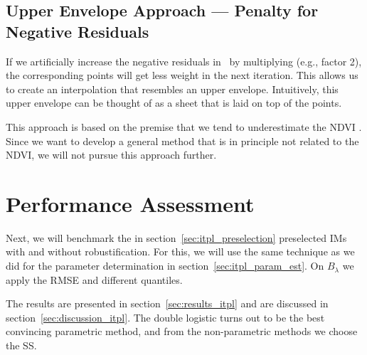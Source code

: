 {	\subsection{Upper Envelope Approach --- Penalty for Negative Residuals}
		If we artificially increase the negative residuals in~ by multiplying (e.g., factor 2), the corresponding points will get less weight in the next iteration. This allows us to create an interpolation that resembles an upper envelope. Intuitively, this upper envelope can be thought of as a sheet that is laid on top of the points.
			
		This approach is based on the premise that we tend to underestimate the NDVI \citep{caoSimpleMethodImprove2018b}. Since we want to develop a general method that is in principle not related to the NDVI, we will not pursue this approach further.	
}
\section{Performance Assessment}{\label{sec:itpl_perfomance_assessment}
	Next, we will benchmark the in section~\ref{sec:itpl_preselection} preselected {{IM}}s with and without robustification. For this, we will use the same technique as we did for the parameter determination in section~\ref{sec:itpl_param_est}. On $B_\lambda$ we apply the RMSE and different quantiles.  

	The results are presented in section~\ref{sec:results_itpl} and are discussed in section~\ref{sec:discussion_itpl}. The double logistic turns out to be the best convincing parametric method, and from the non-parametric methods we choose the SS.
}


